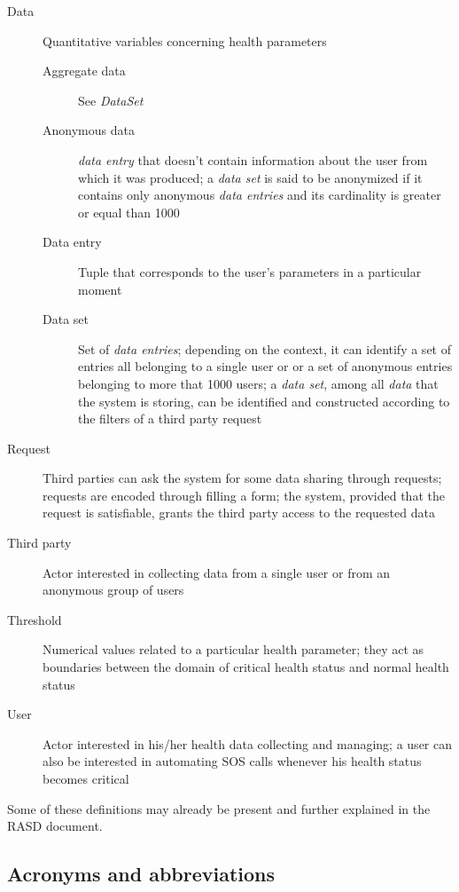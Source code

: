 \documentclass[../DD0.tex]{subfiles}
\begin{document}
    \begin{description}
      \item[Data] Quantitative variables concerning health parameters
      \begin{description}
        \item[Aggregate data] See \textit{DataSet}
        \item[Anonymous data] \textit{data entry} that doesn't contain information about the user from which it was produced; a \textit{data set} is said to be anonymized if it contains only anonymous \textit{data entries} and its cardinality is greater or equal than 1000
        \item[Data entry] Tuple that corresponds to the user's parameters in a particular moment
        \item[Data set] Set of \textit{data entries}; depending on the context, it can identify a set of entries all belonging to a single user or or a set of anonymous entries belonging to more that 1000 users; a \textit{data set}, among all \textit{data} that the system is storing, can be identified and constructed according to the filters of a third party request
      \end{description}
      \item[Request] Third parties can ask the system for some data sharing through requests; requests are encoded through filling a form; the system, provided that the request is satisfiable, grants the third party access to the requested data
      \item[Third party] Actor interested in collecting data from a single user or from an anonymous group of users
      \item[Threshold] Numerical values related to a particular health parameter; they act as boundaries between the domain of critical health status and normal health status
      \item[User] Actor interested in his/her health data collecting and managing; a user can also be interested in automating SOS calls whenever his health status becomes critical
    \end{description}

    Some of these definitions may already be present and further explained in the RASD document.

  \subsection{Acronyms and abbreviations}
  \label{sec:acronyms}
\end{document}
